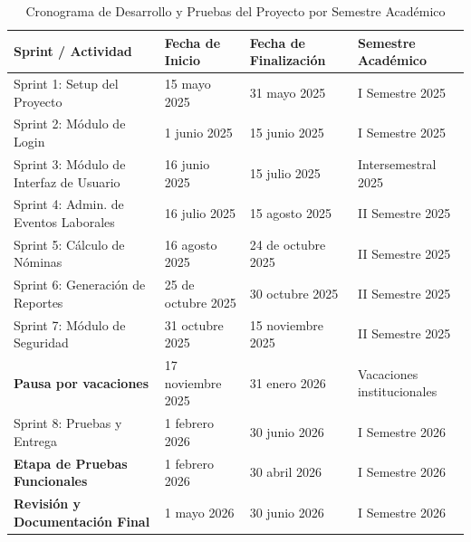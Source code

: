 \begin{table}[h]
	\centering
	\renewcommand{\arraystretch}{1.2}
	\begin{tabular}{|p{5.5cm}|p{3cm}|p{3cm}|p{3.5cm}|}
		\hline
		\textbf{Sprint / Actividad}             & \textbf{Fecha de Inicio} & \textbf{Fecha de Finalización} & \textbf{Semestre Académico} \\ \hline
		Sprint 1: Setup del Proyecto            & 15 mayo 2025             & 31 mayo 2025                   & I Semestre 2025             \\ \hline
		Sprint 2: Módulo de Login               & 1 junio 2025             & 15 junio 2025                  & I Semestre 2025             \\ \hline
		Sprint 3: Módulo de Interfaz de Usuario & 16 junio 2025            & 15 julio 2025                  & Intersemestral 2025         \\ \hline
		Sprint 4: Admin. de Eventos Laborales   & 16 julio 2025            & 15 agosto 2025                 & II Semestre 2025            \\ \hline
		Sprint 5: Cálculo de Nóminas            & 16 agosto 2025           & 24 de octubre 2025             & II Semestre 2025            \\ \hline
		Sprint 6: Generación de Reportes        & 25 de octubre 2025       & 30 octubre 2025                & II Semestre 2025            \\ \hline
		Sprint 7: Módulo de Seguridad           & 31 octubre 2025          & 15 noviembre 2025               & II Semestre 2025            \\ \hline
		\rowcolor{gray!10}
		\textbf{Pausa por vacaciones}           & 17 noviembre 2025         & 31 enero 2026                  & Vacaciones institucionales  \\ \hline
		Sprint 8: Pruebas y Entrega             & 1 febrero 2026           & 30 junio 2026                  & I Semestre 2026             \\ \hline
		\rowcolor{gray!10}
		\textbf{Etapa de Pruebas Funcionales}   & 1 febrero 2026           & 30 abril 2026                  & I Semestre 2026             \\ \hline
		\rowcolor{gray!10}
		\textbf{Revisión y Documentación Final} & 1 mayo 2026              & 30 junio 2026                  & I Semestre 2026             \\ \hline
	\end{tabular}
	\caption{Cronograma de Desarrollo y Pruebas del Proyecto por Semestre Académico}
\end{table}



